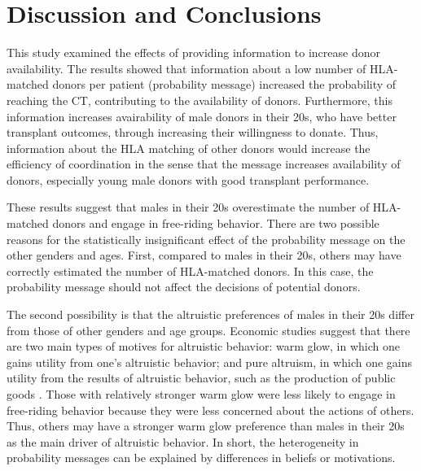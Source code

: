 \documentclass[12pt, a4paper]{article}
\begin{document}
\hypertarget{conclusion}{%
\section{Discussion and Conclusions}\label{conclusion}}

This study examined the effects of providing information to increase donor availability. The results showed that information about a low number of HLA-matched donors per patient (probability message) increased the probability of reaching the CT, contributing to the availability of donors. Furthermore, this information increases avairability of male donors in their 20s, who have better transplant outcomes, through increasing their willingness to donate. Thus, information about the HLA matching of other donors would increase the efficiency of coordination in the sense that the message increases availability of donors, especially young male donors with good transplant performance.

These results suggest that males in their 20s overestimate the number of HLA-matched donors and engage in free-riding behavior. There are two possible reasons for the statistically insignificant effect of the probability message on the other genders and ages. First, compared to males in their 20s, others may have correctly estimated the number of HLA-matched donors. In this case, the probability message should not affect the decisions of potential donors.

The second possibility is that the altruistic preferences of males in their 20s differ from those of other genders and age groups. Economic studies suggest that there are two main types of motives for altruistic behavior: warm glow, in which one gains utility from one's altruistic behavior; and pure altruism, in which one gains utility from the results of altruistic behavior, such as the production of public goods \citep{Andreoni1990}. Those with relatively stronger warm glow were less likely to engage in free-riding behavior because they were less concerned about the actions of others. Thus, others may have a stronger warm glow preference than males in their 20s as the main driver of altruistic behavior. In short, the heterogeneity in probability messages can be explained by differences in beliefs or motivations.
\end{document}
